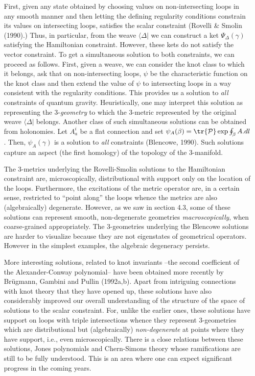 First, given any state obtained by choosing values on non-intersecting loops
in any smooth manner and then letting the defining regularity conditions
constrain its values on intersecting loops, satisfies the scalar constraint
(Rovelli \& Smolin (1990).) Thus, in particular, from the weave $\langle
\Delta|$ we can construct a ket $\Psi_\Delta (\gamma )$satisfying the
Hamiltonian constraint. However, these kets do not satisfy the vector
constraint. To get a simultaneous solution to both constraints, we can
proceed as follows. First, given a weave, we can consider the knot class
to which it belongs, ask that on non-intersecting loops, $\psi$ be the
characteristic function on the knot class and then extend the value of $\psi$
to intersecting loops in a way consistent with the regularity conditions.
This provides us a solution to {\it all} constraints of quantum gravity.
Heuristically, one may interpret this solution as representing the
3-{\it geometry} to which the 3-metric represented by the original weave
$\langle\Delta|$ belongs. Another class of such simultaneous solutions
can be obtained from holonomies. Let $A_a^i$ be a flat connection and set
$\psi_A(\beta) = \tr {\cal P}\exp \oint_\beta A.dl$. Then, $\psi_A(\gamma )$
is a solution to {\it all} constraints (Blencowe, 1990). Such solutions
capture an aspect (the first homology) of the topology of the 3-manifold.

The 3-metrics underlying the Rovelli-Smolin solutions to the Hamiltonian
constraint are, microscopically, distributional with support only on the
location of the loops. Furthermore, the excitations of the metric operator
are, in a certain sense, restricted to ``point along'' the loops whence
the metrics are also (algebraically) degenerate. However, as we saw in
section 4.3, some of these solutions can represent smooth, non-degenerate
geometries {\it macroscopically}, when coarse-grained appropriately. The
3-geometries underlying the Blencowe solutions are harder to visualize
because they are not eigenstates of geometrical operators. However in the
simplest examples, the algebraic degeneracy persists.

More interesting solutions, related to knot invariants --the second
coefficient of the Alexander-Conway polynomial-- have been obtained more
recently by Br\"ugmann, Gambini and Pullin (1992a,b). Apart from
intriguing connections with knot theory that they have opened up, these
solutions have also considerably improved our overall understanding of
the structure of the space of solutions to the scalar constraint. For,
unlike the earlier ones, these solutions have support on loops with triple
intersections whence they represent 3-geometries which are distributional
but (algebraically) {\it non-degenerate} at points where they have
support, i.e., even microscopically. There is a close relations between
these solutions, Jones polynomials and Chern-Simons theory whose
ramifications are still to be fully understood. This is an area where one
can expect significant progress in the coming years.


